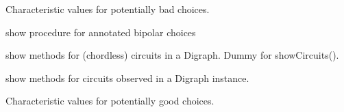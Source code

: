 \documentclass[letterpaper,10pt,english]{sphinxmanual}
\begin{document}
\begin{fulllineitems}
\begin{fulllineitems}
\end{fulllineitems}


\begin{fulllineitems}
\label{techDoc:digraphs.Digraph.showBadChoices}
Characteristic values for potentially bad choices.

\end{fulllineitems}


\begin{fulllineitems}
\label{techDoc:digraphs.Digraph.showChoiceVector}
show procedure for annotated bipolar choices

\end{fulllineitems}


\begin{fulllineitems}
\label{techDoc:digraphs.Digraph.showChordlessCircuits}
show methods for (chordless) circuits in a Digraph.
Dummy for showCircuits().

\end{fulllineitems}


\begin{fulllineitems}
\label{techDoc:digraphs.Digraph.showCircuits}
show methods for circuits observed in a Digraph instance.

\end{fulllineitems}


\begin{fulllineitems}
\label{techDoc:digraphs.Digraph.showComponents}
\end{fulllineitems}


\begin{fulllineitems}
\label{techDoc:digraphs.Digraph.showGoodChoices}
Characteristic values for potentially good choices.


\end{fulllineitems}
\end{fulllineitems}
\end{document}
